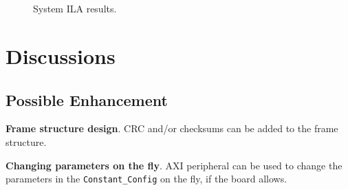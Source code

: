 \documentclass[journal,twoside]{IEEEtran}
\begin{document}
    \begin{figure}
      \setlength{\tabcolsep}{2pt}
      \\
      \\
      \caption{System ILA results.}
    \end{figure}

  \section{Discussions}

    \subsection{Possible Enhancement}

      \textbf{Frame structure design}.
      CRC and/or checksums can be added to the frame structure.

      \textbf{Changing parameters on the fly}.
      AXI peripheral \cite{xilinx:pg127} can be used to change the parameters in the \texttt{Constant\_Config} on the fly,
      if the board allows.
\end{document}
